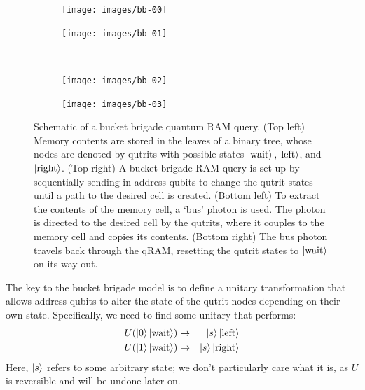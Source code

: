 \documentclass[a4paper,12pt]{article}
\begin{document}
\begin{figure}[ht]
 \centering  
 \captionsetup{width=.89\linewidth}
 \begin{subfigure}{0.45\textwidth}
    \centering
    \texttt{[image: images/bb-00]}
 \end{subfigure}
  \hspace{0.5cm}
  \begin{subfigure}{0.45\textwidth}
    \centering
    \texttt{[image: images/bb-01]}
 \end{subfigure} \\
    \vspace{0.5cm}
     \begin{subfigure}{0.45\textwidth}
        \centering
        \texttt{[image: images/bb-02]}
    \end{subfigure}
    \hspace{0.5cm}
    \begin{subfigure}{0.45\textwidth}
        \centering
        \texttt{[image: images/bb-03]}
    \end{subfigure}
    \caption{Schematic of a bucket brigade quantum RAM query. 
    (Top left) Memory contents are stored in the leaves of a binary tree, whose nodes are denoted by qutrits with possible states $\ket{\hbox{wait}}, \ket{\hbox{left}}$, and $\ket{\hbox{right}}$. 
    (Top right) A bucket brigade RAM query is set up by sequentially sending in address qubits to change the qutrit states until a path to the desired cell is created. 
    (Bottom left) To extract the contents of the memory cell, a `bus' photon is used.
    The photon is directed to the desired cell by the qutrits, where it couples to the memory cell and copies its contents. 
    (Bottom right) The bus photon travels back through the qRAM, resetting the qutrit states to $\ket{\hbox{wait}}$ on its way out.}
    \label{fig:bb-sequence}
\end{figure}

The key to the bucket brigade model is to define a unitary transformation that allows address qubits to alter the state of the qutrit nodes depending on their own state. 
Specifically, we need to find some unitary that performs:
\begin{eqnarray}
 U(\ket{0}\ket{\hbox{wait}}) &\rightarrow& \ket{s}\ket{\hbox{left}} \\
 U(\ket{1}\ket{\hbox{wait}}) &\rightarrow& \ket{s}\ket{\hbox{right}}
\end{eqnarray}
Here, $\ket{s}$ refers to some arbitrary state; we don't particularly care what it is, as $U$ is reversible and will be undone later on.
\end{document}
